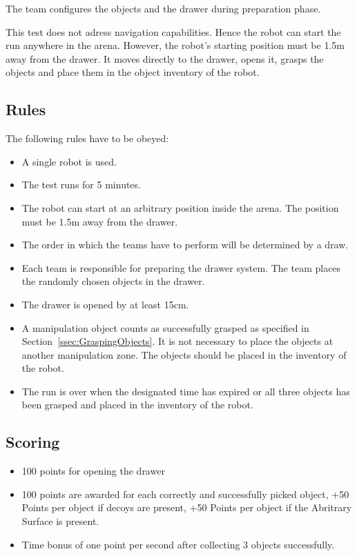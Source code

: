 The team configures the objects and the drawer during preparation phase.

This test does not adress navigation capabilities. Hence the robot can start the run anywhere in the arena. However, the robot’s starting position must be 1.5m away from the drawer. It moves directly to the drawer, opens it, grasps the objects and place them in the object inventory of the robot.

\subsection{Rules}
The following rules have to be obeyed:

\begin{itemize}
\item A single robot is used.
\item The test runs for 5 minutes.
\item The robot can start at an arbitrary position inside the arena. The position must be 1.5m away from the drawer.
\item The order in which the teams have to perform will be determined by a draw.
\item Each team is responsible for preparing the drawer system. The team places the randomly chosen objects in the drawer.
\item The drawer is opened by at least 15cm.
\item A manipulation object counts as successfully grasped as specified in Section~\ref{ssec:GraspingObjects}. It is not necessary to place the objects at another manipulation zone. The objects should be placed in the inventory of the robot.
\item The run is over when the designated time has expired or all three objects has been grasped and placed in the inventory of the robot.
\end{itemize}

\subsection{Scoring}
\begin{itemize}
\item 100 points for opening the drawer
\item 100 points are awarded for each correctly and successfully picked object, +50 Points per object if decoys are present, +50 Points per object if the Abritrary Surface is present.
\item Time bonus of one point per second after collecting 3 objects successfully.
\end{itemize}
